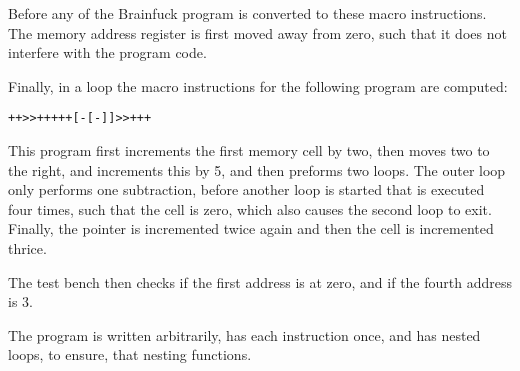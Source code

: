 Before any of the Brainfuck program is converted to these macro instructions. The memory address register is first moved away from zero, such that it does not interfere with the program code.

Finally, in a loop the macro instructions for the following program are computed: 

\begin{lstlisting}[caption=Brainfuck program, label=lst:brainfuck]
    ++>>+++++[-[-]]>>+++
\end{lstlisting}

This program first increments the first memory cell by two, then moves two to the right, and increments this by 5, and then preforms two loops. The outer loop only performs one subtraction, before another loop is started that is executed four times, such that the cell is zero, which also causes the second loop to exit. Finally, the pointer is incremented twice again and then the cell is incremented thrice. 

The test bench then checks if the first address is at zero, and if the fourth address is 3.

The program is written arbitrarily, has each instruction once, and has nested loops, to ensure, that nesting functions. 


